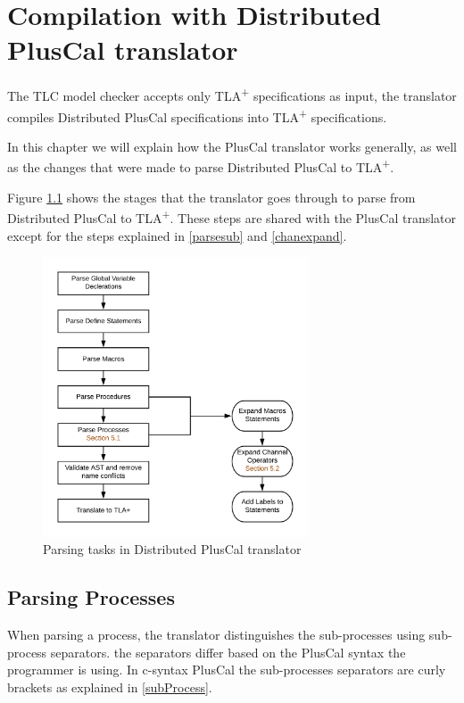 \documentclass{thesul}
\newcommand{\tlaplus}{TLA\textsuperscript{+}\xspace}
\begin{document}
\chapter{Compilation with Distributed PlusCal translator}

The TLC model checker accepts only \tlaplus specifications as input, the translator compiles Distributed PlusCal specifications into \tlaplus specifications.

In this chapter we will explain how the PlusCal translator works generally, as well as the changes that were made to parse Distributed PlusCal to \tlaplus.

Figure \ref{translator} shows the stages that the translator goes through to parse from Distributed PlusCal to \tlaplus. These steps are shared with the PlusCal translator except for the steps explained in \ref{parsesub} and \ref{chanexpand}.

\begin{figure}[!h]
\label{translator}
\centering
\includegraphics[width=0.7\textwidth]{chart}
\caption{Parsing tasks in Distributed PlusCal translator}
\end{figure}
\section{Parsing Processes}

When parsing a process, the translator distinguishes the sub-processes using sub-process separators. the separators differ based on the PlusCal syntax the programmer is using. In c-syntax PlusCal the sub-processes separators are curly brackets as explained in \ref{subProcess}.
\end{document}
